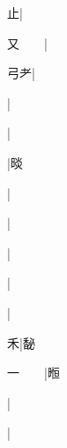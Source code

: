 \begin{multicols}{2}
{{\cjk{}{\cnsym{}　}{\cnsym{}　}止}|{}\par
{\cjk{}又{\cnsym{}　}{\cnsym{}　}}|{}\par
{\cjk{}{\cnsym{}　}弓耂}|{}\par
{\cjk{}{\cnsym{}　}{\cnsym{}　}{\cnsym{}　}}|{}\par
{\cjk{}{\cnsym{}　}{\cnsym{}　}{\cnsym{}　}}|{}\par
{\cjk{}{\cnsym{}　}{\cnsym{}　}{\cnsym{}　}}|{\cjk{}晱}\par
{}|{}\par
{\cjk{}{\cnsym{}　}{\cnsym{}　}{\cnsym{}　}}|{}\par
{\cjk{}{\cnsym{}　}{\cnsym{}　}{\cnsym{}　}}|{}\par
{\cjk{}{\cnsym{}　}{\cnsym{}　}{\cnsym{}　}}|{}\par
{\cjk{}{\cnsym{}　}{\cnsym{}　}{\cnsym{}　}}|{}\par
{\cjk{}{\cnsym{}　}{\cnsym{}　}禾}|{\cjk{}馝}\par
{\cjk{}一{\cnsym{}　}{\cnsym{}　}}|{\cjk{}暅}\par
{\cjk{}{\cnsym{}　}{\cnsym{}　}{\cnsym{}　}}|{}\par
{\cjk{}{\cnsym{}　}{\cnsym{}　}{\cnsym{}　}}|{}\par
}
\end{multicols}

